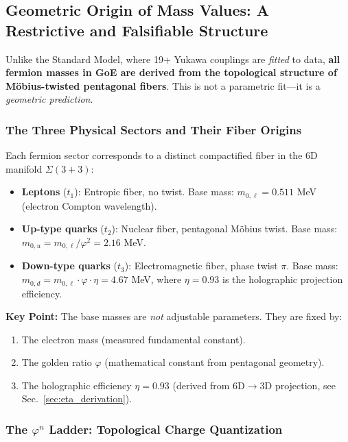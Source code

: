 \documentclass[12pt]{article}
\theoremstyle{definition}
\theoremstyle{plain}
\begin{document}
\subsection{Geometric Origin of Mass Values: A Restrictive and Falsifiable Structure}
\label{sec:geometric_origin}

Unlike the Standard Model, where 19+ Yukawa couplings are \textit{fitted} to data, \textbf{all fermion masses in GoE are derived from the topological structure of M\"obius-twisted pentagonal fibers}. This is not a parametric fit—it is a \textit{geometric prediction}.

\subsubsection{The Three Physical Sectors and Their Fiber Origins}

Each fermion sector corresponds to a distinct compactified fiber in the 6D manifold $\Sigma(3+3)$:

\begin{itemize}
\item \textbf{Leptons} ($t_1$): Entropic fiber, no twist. Base mass: $m_{0,\ell} = 0.511$ MeV (electron Compton wavelength).
\item \textbf{Up-type quarks} ($t_2$): Nuclear fiber, pentagonal M\"obius twist. Base mass: $m_{0,u} = m_{0,\ell}/\varphi^2 = 2.16$ MeV.
\item \textbf{Down-type quarks} ($t_3$): Electromagnetic fiber, phase twist $\pi$. Base mass: $m_{0,d} = m_{0,\ell} \cdot \varphi \cdot \eta = 4.67$ MeV, where $\eta = 0.93$ is the holographic projection efficiency.
\end{itemize}

\textbf{Key Point:} The base masses are \textit{not} adjustable parameters. They are fixed by:
\begin{enumerate}
\item The electron mass (measured fundamental constant).
\item The golden ratio $\varphi$ (mathematical constant from pentagonal geometry).
\item The holographic efficiency $\eta = 0.93$ (derived from 6D$\to$3D projection, see Sec.~\ref{sec:eta_derivation}).
\end{enumerate}

\subsubsection{The $\varphi^n$ Ladder: Topological Charge Quantization}
\end{document}
